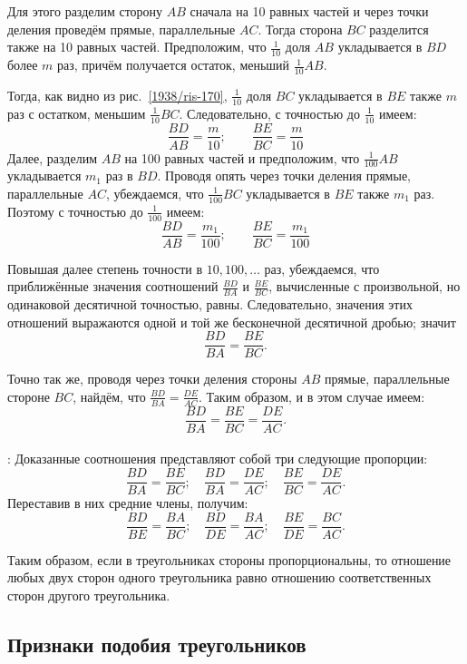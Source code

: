 Для этого разделим сторону $AB$ сначала на 10 равных частей и через точки деления проведём прямые, параллельные $AC$.
Тогда сторона $BC$ разделится также на 10 равных частей.
Предположим, что $\tfrac1{10}$ доля $AB$ укладывается в $BD$ более $m$
раз, причём получается остаток, меньший $\tfrac1{10}AB$.

Тогда, как видно из рис.~\ref{1938/ris-170}, $\tfrac1{10}$ доля $BC$ укладывается в $BE$ также $m$ раз с остатком, меньшим $\tfrac1{10}BC$.
Следовательно, с точностью до $\tfrac1{10}$ имеем:
\[\frac{BD}{AB}=\frac{m}{10}; 
\qquad
\frac{BE}{BC}=\frac{m}{10}\]
Далее, разделим $AB$ на 100 равных частей и предположим, что $\tfrac1{100}AB$ укладывается $m_1$ раз в $BD$.
Проводя опять через точки деления прямые, параллельные $AC$, убеждаемся, что $\tfrac1{100}BC$ укладывается в $BE$ также $m_1$ раз.
Поэтому с точностью до $\tfrac1{100}$ имеем:
\[\frac{BD}{AB}=\frac{m_1}{100}; 
\qquad
\frac{BE}{BC}=\frac{m_1}{100}\]

Повышая далее степень точности в $10,100,\dots$ раз, убеждаемся, что приближённые значения соотношений $\frac{BD}{BA}$ и $\frac{BE}{BC}$, вычисленные с произвольной, но одинаковой десятичной точностью, равны.
Следовательно, значения этих отношений выражаются одной и той же бесконечной десятичной дробью;
значит
\[\frac{BD}{BA}=\frac{BE}{BC}.\]

Точно так же, проводя через точки деления стороны $AB$ прямые, параллельные стороне $BC$, найдём, что
$\frac{BD}{BA}=\frac{DE}{AC}$.
Таким образом, и в этом случае имеем:
\[\frac{BD}{BA}=\frac{BE}{BC}=\frac{DE}{AC}.\]

{\small

\paragraph{}\label{1938/160}
:
Доказанные соотношения представляют собой три следующие пропорции:
\[\frac{BD}{BA}=\frac{BE}{BC};
\quad
\frac{BD}{BA}=\frac{DE}{AC};
\quad
\frac{BE}{BC}=\frac{DE}{AC}.\]
Переставив в них средние члены, получим:
\[\frac{BD}{BE}=\frac{BA}{BC};
\quad
\frac{BD}{DE}=\frac{BA}{AC};
\quad
\frac{BE}{DE}=\frac{BC}{AC}.\]

Таким образом, если в треугольниках стороны пропорциональны, то отношение любых двух сторон одного треугольника равно отношению соответственных сторон другого треугольника.
}

\subsection*{Признаки подобия треугольников}

